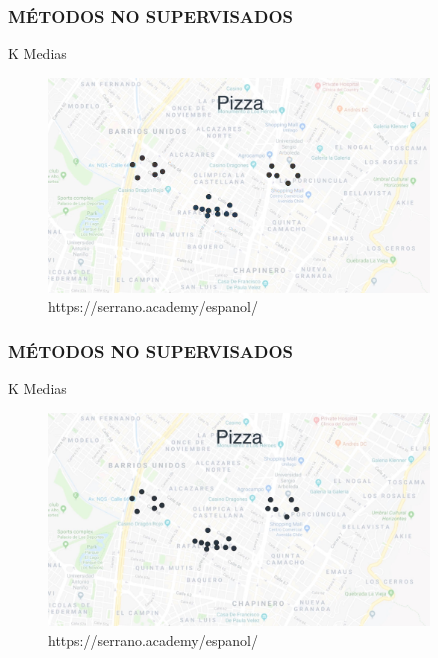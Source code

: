 \documentclass{beamer}
\begin{document}
\begin{frame}
	\frametitle{MÉTODOS NO SUPERVISADOS}
	\begin{block}{K Medias}	
		\begin{figure}
			\includegraphics[width=0.9\textwidth]{Imagenes_k_means/IMG_3507.jpg}
			\caption{https://serrano.academy/espanol/}
		\end{figure}
	\end{block}
\end{frame}

 \begin{frame}
 	\frametitle{MÉTODOS NO SUPERVISADOS}
 	\begin{block}{K Medias}	
 		\begin{figure}
 			\includegraphics[width=0.9\textwidth]{Imagenes_k_means/IMG_3508.jpg}
 			\caption{https://serrano.academy/espanol/}
 		\end{figure}
 	\end{block}
 \end{frame}
\end{document}
